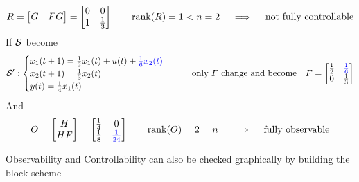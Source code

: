 \begin{example}[SISO system of order $n=2$]
    \[
        R = \begin{bmatrix}
            G & FG
        \end{bmatrix} = \begin{bmatrix}
            0 & 0 \\
            1 & \frac{1}{3}
        \end{bmatrix}
        \qquad
        \operatorname*{rank} (R) = 1 < n = 2
        \quad\implies\quad \text{not fully controllable}
    \]
    If $\mathcal{S}$ become 
    \begin{align*}
    \mathcal{S'}: 
        \begin{cases}
            x_1(t+1) = \frac{1}{2} x_1(t) + u(t) + \color{blue}\frac{1}{6} x_2(t)\\
            x_2(t+1) = \frac{1}{3}x_2(t) \\
            y(t) = \frac{1}{4}x_1(t)
        \end{cases}
        \qquad
        \text{only $F$ change and become}\quad
        F = \begin{bmatrix}
            \frac{1}{2} & \color{blue}\frac{1}{6} \\
            0 & \frac{1}{3}
        \end{bmatrix}
    \end{align*} 
    And     
    \[
        O = \begin{bmatrix}
            H \\
            HF
        \end{bmatrix} = \begin{bmatrix}
            \frac{1}{4} & 0 \\
            \frac{1}{8} & \color{blue}\frac{1}{24}
        \end{bmatrix}
        \qquad
        \operatorname*{rank} (O) = 2 = n         \quad\implies\quad \text{fully observable}
    \]
    
    Observability and Controllability can also be checked graphically by building the block scheme 
    
      \begin{figure}[H]
        \centering
\end{figure}
\end{example}
